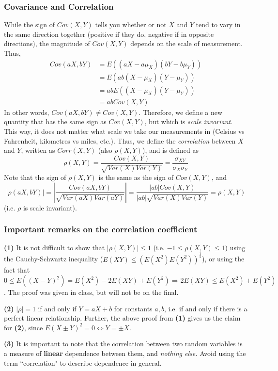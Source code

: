 \documentclass[12pt]{article}
\begin{document}
\subsubsection{Covariance and Correlation}
While the sign of $Cov(X,Y)$ tells you whether or not $X$ and $Y$ tend to vary in the same direction together (positive if they do, negative if in opposite directions), the magnitude of $Cov(X,Y)$ depends on the scale of measurement. Thus,
\begin{align*}
    Cov(aX,bY) &= E((aX - a \mu_X)(bY - b \mu_Y)) \\
        &= E(ab(X - \mu_X)(Y- \mu_Y)) \\
        &= a b E((X-\mu_X)(Y-\mu_Y)) \\
        &= a b Cov(X,Y)
\end{align*}
In other words, $Cov(aX, bY) \neq Cov(X,Y)$. Therefore, we define a new quantity that has the same sign as $Cov(X,Y)$, but which is \emph{scale invariant}. This way, it does not matter what scale we take our measurements in (Celsius vs Fahrenheit, kilometres vs miles, etc.). Thus, we define the \emph{correlation} between $X$ and $Y$, written as $Corr(X,Y)$ (also $\rho(X,Y)$), and is defined as
\[
    \rho (X,Y) = \frac{Cov(X,Y)}{\sqrt{Var(X) Var(Y)}} = \frac{\sigma_{XY}}{\sigma_X \sigma_Y}
\]
Note that the sign of $\rho (X,Y)$ is the same as the sign of $Cov(X,Y)$, and
\[
    | \rho (aX,bY) | = |\frac{Cov(aX,bY)}{\sqrt{Var(aX) Var(aY)}}| = \frac{|ab|Cov(X,Y)}{|ab|\sqrt{Var(X) Var(Y)}} = \rho (X,Y)
\]
(i.e. $\rho$ is scale invariant).

\subsubsection{Important remarks on the correlation coefficient}
\textbf{(1)} It is not difficult to show that $|\rho(X,Y)| \leq 1$ (i.e. $-1 \leq \rho(X,Y) \leq 1$) using the Cauchy-Schwartz inequality ($E(XY) \leq (E(X^2)E(Y^2))^{\frac{1}{2}}$), or using the fact that $0 \leq E((X-Y)^2) = E(X^2) - 2E(XY) + E(Y^2) \Rightarrow 2 E(XY) \leq E(X^2)+E(Y^2)$. The proof was given in class, but will not be on the final.

\textbf{(2)} $|\rho| = 1$ if and only if $Y = aX + b$ for constants $a,b$, i.e. if and only if there is a perfect linear relationship. Further, the above proof from \textbf{(1)} gives us the claim for \textbf{(2)}, since $E(X \pm Y)^2 = 0 \Leftrightarrow Y = \pm X$.

\textbf{(3)} It is important to note that the correlation between two random variables is a measure of \textbf{linear} dependence between them, and \emph{nothing else.} Avoid using the term ``correlation" to describe dependence in general.
\end{document}
